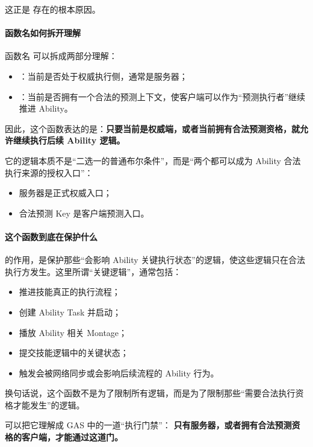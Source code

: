 这正是  存在的根本原因。

\paragraph{函数名如何拆开理解}

函数名  可以拆成两部分理解：

\begin{itemize}
	\item {}：当前是否处于权威执行侧，通常是服务器；
	\item {}：当前是否拥有一个合法的预测上下文，使客户端可以作为“预测执行者”继续推进 Ability。
\end{itemize}

因此，这个函数表达的是：\textbf{只要当前是权威端，或者当前拥有合法预测资格，就允许继续执行后续 Ability 逻辑。}


它的逻辑本质不是“二选一的普通布尔条件”，而是“两个都可以成为 Ability 合法执行来源的授权入口”：

\begin{itemize}
	\item 服务器是正式权威入口；
	\item 合法预测 Key 是客户端预测入口。
\end{itemize}

\paragraph{这个函数到底在保护什么}
 的作用，是保护那些“会影响 Ability 关键执行状态”的逻辑，使这些逻辑只在合法执行方发生。这里所谓“关键逻辑”，通常包括：

\begin{itemize}
	\item 推进技能真正的执行流程；
	\item 创建 Ability Task 并启动；
	\item 播放 Ability 相关 Montage；
	\item 提交技能逻辑中的关键状态；
	\item 触发会被网络同步或会影响后续流程的 Ability 行为。
\end{itemize}

换句话说，这个函数不是为了限制所有逻辑，而是为了限制那些“需要合法执行资格才能发生”的逻辑。

可以把它理解成 GAS 中的一道“执行门禁”：	\textbf{只有服务器，或者拥有合法预测资格的客户端，才能通过这道门。}

